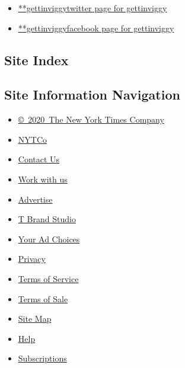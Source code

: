 \begin{itemize}
\tightlist
\item
  \href{https://twitter.com/gettinviggy}{**gettinviggytwitter page for
  gettinviggy}
\item
  \href{https://www.facebook.com/gettinviggy}{**gettinviggyfacebook page
  for gettinviggy}
\end{itemize}

\hypertarget{site-index}{%
\subsection{Site Index}\label{site-index}}

\hypertarget{site-information-navigation}{%
\subsection{Site Information
Navigation}\label{site-information-navigation}}

\begin{itemize}
\tightlist
\item
  \href{https://help.nytimes.com/hc/en-us/articles/115014792127-Copyright-notice}{©~2020~The
  New York Times Company}
\end{itemize}

\begin{itemize}
\tightlist
\item
  \href{https://www.nytco.com/}{NYTCo}
\item
  \href{https://help.nytimes.com/hc/en-us/articles/115015385887-Contact-Us}{Contact
  Us}
\item
  \href{https://www.nytco.com/careers/}{Work with us}
\item
  \href{https://nytmediakit.com/}{Advertise}
\item
  \href{http://www.tbrandstudio.com/}{T Brand Studio}
\item
  \href{https://www.nytimes.com/privacy/cookie-policy\#how-do-i-manage-trackers}{Your
  Ad Choices}
\item
  \href{https://www.nytimes.com/privacy}{Privacy}
\item
  \href{https://help.nytimes.com/hc/en-us/articles/115014893428-Terms-of-service}{Terms
  of Service}
\item
  \href{https://help.nytimes.com/hc/en-us/articles/115014893968-Terms-of-sale}{Terms
  of Sale}
\item
  \href{https://spiderbites.nytimes.com}{Site Map}
\item
  \href{https://help.nytimes.com/hc/en-us}{Help}
\item
  \href{https://www.nytimes.com/subscription?campaignId=37WXW}{Subscriptions}
\end{itemize}
